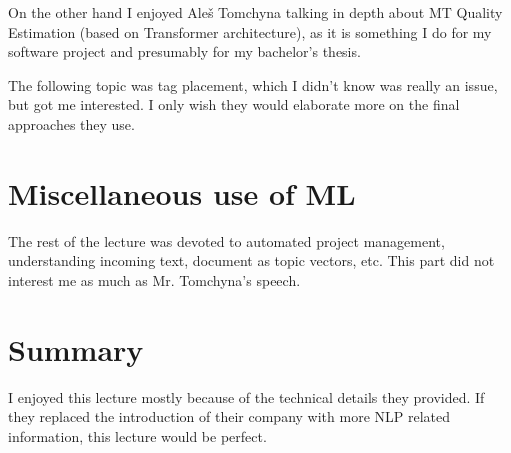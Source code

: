 \documentclass[a4paper]{article}
\begin{document}
On the other hand I enjoyed Aleš Tomchyna talking in depth about MT Quality Estimation (based on Transformer architecture), as it is something I do for my software project and presumably for my bachelor's thesis.

The following topic was tag placement, which I didn't know was really an issue, but got me interested. I only wish they would elaborate more on the final approaches they use.

\section*{Miscellaneous use of ML}

The rest of the lecture was devoted to automated project management, understanding incoming text, document as topic vectors, etc. This part did not interest me as much as Mr. Tomchyna's speech.

\section*{Summary}

I enjoyed this lecture mostly because of the technical details they provided. If they replaced the introduction of their company with more NLP related information, this lecture would be perfect.
\end{document}

